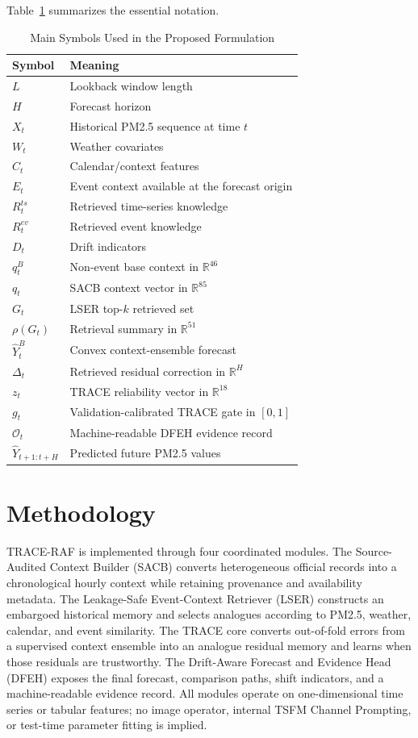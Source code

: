 \documentclass{ieeeaccess}
\begin{document}
Table~\ref{tab:symbols} summarizes the essential notation.

\begin{table}[!t]
\centering
\caption{Main Symbols Used in the Proposed Formulation}
\label{tab:symbols}
\begin{tabular}{ll}
\toprule
Symbol & Meaning \\
\midrule
$L$ & Lookback window length \\
$H$ & Forecast horizon \\
$X_t$ & Historical PM2.5 sequence at time $t$ \\
$W_t$ & Weather covariates \\
$C_t$ & Calendar/context features \\
$E_t$ & Event context available at the forecast origin \\
$R^{ts}_t$ & Retrieved time-series knowledge \\
$R^{ev}_t$ & Retrieved event knowledge \\
$D_t$ & Drift indicators \\
$q^B_t$ & Non-event base context in $\mathbb{R}^{46}$ \\
$q_t$ & SACB context vector in $\mathbb{R}^{85}$ \\
$G_t$ & LSER top-$k$ retrieved set \\
$\rho(G_t)$ & Retrieval summary in $\mathbb{R}^{51}$ \\
$\hat{Y}^{B}_t$ & Convex context-ensemble forecast \\
$\Delta_t$ & Retrieved residual correction in $\mathbb{R}^{H}$ \\
$z_t$ & TRACE reliability vector in $\mathbb{R}^{18}$ \\
$g_t$ & Validation-calibrated TRACE gate in $[0,1]$ \\
$\mathcal{O}_t$ & Machine-readable DFEH evidence record \\
$\hat{Y}_{t+1:t+H}$ & Predicted future PM2.5 values \\
\bottomrule
\end{tabular}
\end{table}
\section{Methodology}

TRACE-RAF is implemented through four coordinated modules. The Source-Audited
Context Builder (SACB) converts heterogeneous official records into a
chronological hourly context while retaining provenance and availability
metadata. The Leakage-Safe Event-Context Retriever (LSER) constructs an
embargoed historical memory and selects analogues according to PM2.5, weather,
calendar, and event similarity. The TRACE core converts out-of-fold errors from
a supervised context ensemble into an analogue residual memory and learns when
those residuals are trustworthy. The Drift-Aware Forecast and Evidence Head
(DFEH) exposes the final forecast, comparison paths, shift indicators, and a
machine-readable evidence record. All modules operate on one-dimensional time
series or tabular features; no image operator, internal TSFM Channel Prompting,
or test-time parameter fitting is implied.
\end{document}
